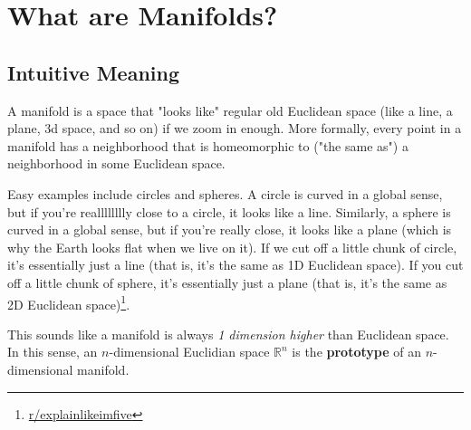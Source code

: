 \section{What are Manifolds?}

\subsection{Intuitive Meaning}
\label{subsec:intuitive-manifolds}

A manifold is a space that "looks like" regular old Euclidean space (like a line, a plane, 3d space, and so on) if we
zoom in enough. More formally, every point in a manifold has a neighborhood that is homeomorphic to ("the same as") a
neighborhood in some Euclidean space.

Easy examples include circles and spheres. A circle is curved in a global sense, but if you're realllllllly close to a
circle, it looks like a line. Similarly, a sphere is curved in a global sense, but if you're really close, it looks like
a plane (which is why the Earth looks flat when we live on it). If we cut off a little chunk of circle, it's essentially
just a line (that is, it's the same as 1D Euclidean space). If you cut off a little chunk of sphere, it's essentially
just a plane (that is, it's the same as 2D Euclidean space)\footnote{\href{https://www.reddit.com/r/explainlikeimfive/comments/nvifq7/comment/h13wot6/?utm\_source=share\&utm\_medium=web3x\&utm\_name=web3xcss\&utm\_term=1\&utm\_content=share\_button}{r/explainlikeimfive}}.

This sounds like a manifold is always \textit{1 dimension higher} than Euclidean space. In this sense, an
$n$-dimensional Euclidian space $\mathbb{R}^n$ is the \textbf{prototype} of an $n$-dimensional manifold.

